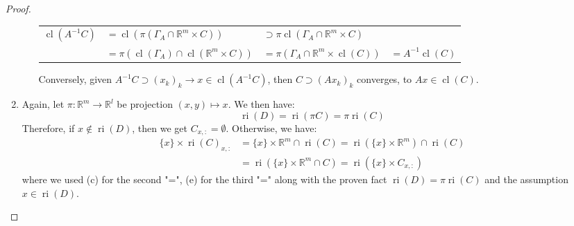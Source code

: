 \begin{proof}
\begin{enumerate}[label=(\alph*)]
\begin{enumerate}[label=(\roman*)]
\begin{center}
\begin{tabular}{llll}
					            $\operatorname{cl}(A^{-1}C)$ & $=\operatorname{cl}(\pi (\Gamma_A\cap \mathbb{R}^m\times C))$                      & $\supset\pi \operatorname{cl}(\Gamma_A\cap \mathbb{R}^m\times C)$                                 \\
					                                         & $=\pi (\operatorname{cl}( \Gamma_A )\cap \operatorname{cl}(\mathbb{R}^m\times C))$ & $=\pi ( \Gamma_A \cap \mathbb{R}^m\times \operatorname{cl}(C))$   & $=A^{-1}\operatorname{cl}(C)$
				            \end{tabular}
			            \end{center}
			            Conversely, given $A^{-1}C\supset (x_k)_k\to x\in \operatorname{cl}(A^{-1}C)$, then $C\supset (Ax_k)_k$ converges, to $Ax\in \operatorname{cl}(C)$.
		      \end{enumerate}
		\item Again, let $\pi:\mathbb{R}^{m}\to \mathbb{R}^l$ be projection $(x,y)\mapsto x$. We then have:
		      \[
			      \operatorname{ri}(D)=\operatorname{ri}(\pi C)=\pi \operatorname{ri}(C)
		      \]
		      Therefore, if $x\notin \operatorname{ri}(D)$, then we get $C_{x,:}=\emptyset$. Otherwise, we have:
		      \begin{align*}
			      \{x\}\times \operatorname{ri}(C)_{x,:} & = \{x\}\times \mathbb{R}^m\cap \operatorname{ri}(C) = \operatorname{ri}(\{x\}\times \mathbb{R}^m)\cap \operatorname{ri}(C) \\
			                                             & = \operatorname{ri}(\{x\}\times \mathbb{R}^m\cap C) = \operatorname{ri}(\{x\}\times C_{x,:})
		      \end{align*}
		      where we used (c) for the second "=", (e) for the third "=" along with the proven fact $\operatorname{ri}(D)=\pi \operatorname{ri}(C)$ and the assumption $x\in \operatorname{ri}(D)$. \qedhere{}
	\end{enumerate}
\end{proof}

